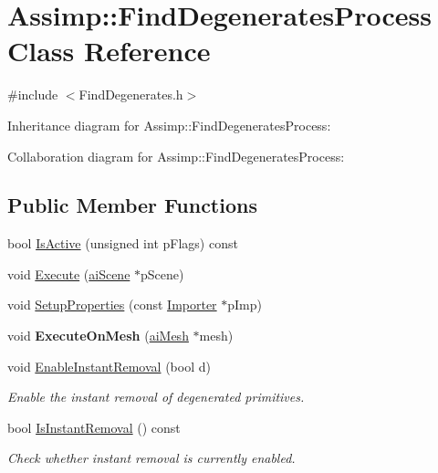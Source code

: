 \hypertarget{class_assimp_1_1_find_degenerates_process}{\section{Assimp\+:\+:Find\+Degenerates\+Process Class Reference}
\label{class_assimp_1_1_find_degenerates_process}
}


{\ttfamily \#include $<$Find\+Degenerates.\+h$>$}



Inheritance diagram for Assimp\+:\+:Find\+Degenerates\+Process\+:


Collaboration diagram for Assimp\+:\+:Find\+Degenerates\+Process\+:
\subsection*{Public Member Functions}
\begin{DoxyCompactItemize}
\item 
bool \hyperlink{class_assimp_1_1_find_degenerates_process_aa4ec62e362646239675c1db154a2699e}{Is\+Active} (unsigned int p\+Flags) const 
\item 
void \hyperlink{class_assimp_1_1_find_degenerates_process_a0495ffd765f243635ab744d824162715}{Execute} (\hyperlink{structai_scene}{ai\+Scene} $\ast$p\+Scene)
\item 
void \hyperlink{class_assimp_1_1_find_degenerates_process_aee0cbbab7892280365353b44d63d1dee}{Setup\+Properties} (const \hyperlink{class_assimp_1_1_importer}{Importer} $\ast$p\+Imp)
\item 
\hypertarget{class_assimp_1_1_find_degenerates_process_a88bdfa61ffca53092ec11fe2968b4d7b}{void {\bfseries Execute\+On\+Mesh} (\hyperlink{structai_mesh}{ai\+Mesh} $\ast$mesh)}\label{class_assimp_1_1_find_degenerates_process_a88bdfa61ffca53092ec11fe2968b4d7b}

\item 
void \hyperlink{class_assimp_1_1_find_degenerates_process_a3453dbbd97bf100a2081c800b92b448f}{Enable\+Instant\+Removal} (bool d)
\begin{DoxyCompactList}\small\item\em Enable the instant removal of degenerated primitives. \end{DoxyCompactList}\item 
bool \hyperlink{class_assimp_1_1_find_degenerates_process_a149a308e64733cf4bdb744f70944cf6a}{Is\+Instant\+Removal} () const 
\begin{DoxyCompactList}\small\item\em Check whether instant removal is currently enabled. \end{DoxyCompactList}\end{DoxyCompactItemize}

